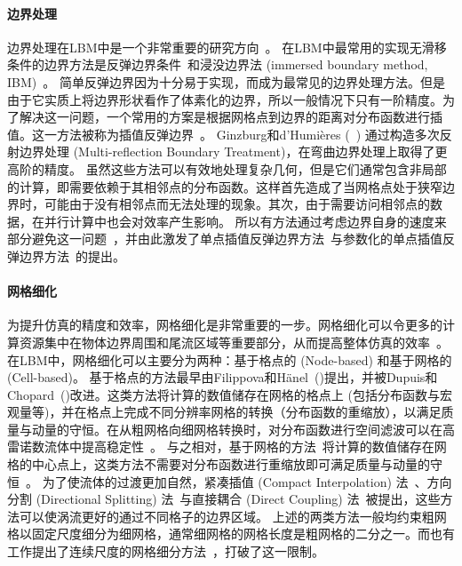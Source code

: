 \paragraph{边界处理}
边界处理在LBM中是一个非常重要的研究方向~\cite{Marson-2022}。
在LBM中最常用的实现无滑移条件的边界方法是反弹边界条件~\cite{Ladd-1994, Bouzidi-2001, Ginzburg-2003, Chun-2007}和浸没边界法 (immersed boundary method, IBM)~\cite{Peskin-1972, Lu-2012, Kang-2011, Patel-2018, Seo-2011, Chen-2013}。
简单反弹边界因为十分易于实现，而成为最常见的边界处理方法。但是由于它实质上将边界形状看作了体素化的边界，所以一般情况下只有一阶精度。为了解决这一问题，一个常用的方案是根据网格点到边界的距离对分布函数进行插值。这一方法被称为插值反弹边界~\cite{Bouzidi-2001, Yu-2003}。
Ginzburg和d'Humières (~\citeyear{Ginzburg-2003}) 通过构造多次反射边界处理 (Multi-reflection Boundary Treatment)，在弯曲边界处理上取得了更高阶的精度。
虽然这些方法可以有效地处理复杂几何，但是它们通常包含非局部的计算，即需要依赖于其相邻点的分布函数。这样首先造成了当网格点处于狭窄边界时，可能由于没有相邻点而无法处理的现象。其次，由于需要访问相邻点的数据，在并行计算中也会对效率产生影响。
所以有方法通过考虑边界自身的速度来部分避免这一问题~\cite{Chun-2007}，并由此激发了单点插值反弹边界方法~\cite{Zhao-2017, Geier-2015, Tao-2018-b}与参数化的单点插值反弹边界方法~\cite{Zhao-2019, Chen-2021-b, Marson-2021}的提出。

\paragraph{网格细化}
为提升仿真的精度和效率，网格细化是非常重要的一步。网格细化可以令更多的计算资源集中在物体边界周围和尾流区域等重要部分，从而提高整体仿真的效率~\cite{Sandoval-2012}。在LBM中，网格细化可以主要分为两种：基于格点的 (Node-based) 和基于网格的 (Cell-based)。
基于格点的方法最早由Filippova和Hänel~(\citeyear{Filippova-1998})提出，并被Dupuis和Chopard~(\citeyear{Dupuis-2003})改进。这类方法将计算的数值储存在网格的格点上 (包括分布函数与宏观量等)，并在格点上完成不同分辨率网格的转换（分布函数的重缩放），以满足质量与动量的守恒。在从粗网格向细网格转换时，对分布函数进行空间滤波可以在高雷诺数流体中提高稳定性~\cite{Lagrava-2012}。
与之相对，基于网格的方法~\cite{Rohde-2006, Chen-2006}将计算的数值储存在网格的中心点上，这类方法不需要对分布函数进行重缩放即可满足质量与动量的守恒~\cite{Schornbaum-2016, Hasert-2014, Latt-2021}。
为了使流体的过渡更加自然，紧凑插值 (Compact Interpolation) 法~\cite{Fard-2015}、方向分割 (Directional Splitting) 法~\cite{Gendre-2017}与直接耦合 (Direct Coupling) 法~\cite{Astoul-2021}被提出，这些方法可以使涡流更好的通过不同格子的边界区域。
上述的两类方法一般均约束粗网格以固定尺度细分为细网格，通常细网格的网格长度是粗网格的二分之一。而也有工作提出了连续尺度的网格细分方法~\cite{Li-2019}，打破了这一限制。


